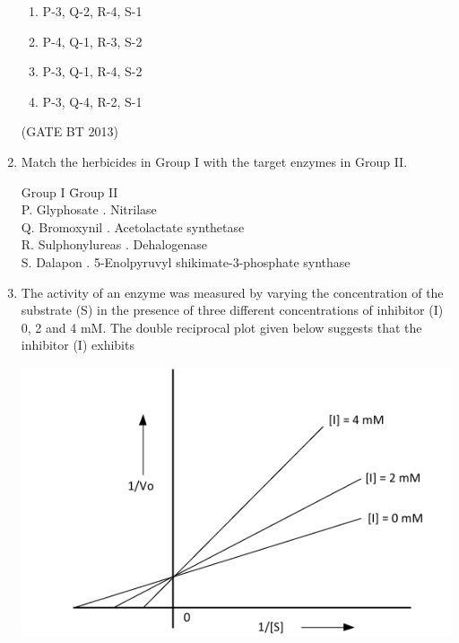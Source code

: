 \documentclass[journal,12pt,onecolumn]{IEEEtran}
\theoremstyle{remark}
\begin{document}
\begin{enumerate}
\begin{enumerate}
    \item P-3, Q-2, R-4, S-1
    \item P-4, Q-1, R-3, S-2
    \item P-3, Q-1, R-4, S-2
    \item P-3, Q-4, R-2, S-1
\end{enumerate} \hfill(GATE BT 2013)

\item 

Match the herbicides in Group I with the target enzymes in Group II.

\begin{tabbing}
Group I \hspace{3.5cm} \= Group II \\
P. Glyphosate . Nitrilase \\
Q. Bromoxynil . Acetolactate synthetase \\
R. Sulphonylureas . Dehalogenase \\
S. Dalapon . 5-Enolpyruvyl shikimate-3-phosphate synthase \\
\end{tabbing}


    \item The activity of an enzyme was measured by varying the concentration of the substrate (S) 
    in the presence of three different concentrations of inhibitor (I) 0, 2 and 4 mM. 
    The double reciprocal plot given below suggests that the inhibitor (I) exhibits

    \begin{center}
    \includegraphics[width=\columnwidth]{images/enzyme_plot.png}
    \end{center}


\end{enumerate}
\end{document}
